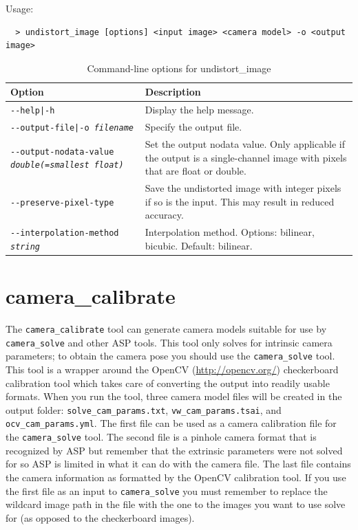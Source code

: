 Usage:
\begin{verbatim}
  > undistort_image [options] <input image> <camera model> -o <output image>
\end{verbatim}

\begin{longtable}{|l|p{7.5cm}|}
\caption{Command-line options for undistort\_image}
\label{tbl:undistortimage}
\endfirsthead
\endhead
\endfoot
\endlastfoot
\hline
Option & Description \\ \hline \hline
\texttt{-\/-help|-h} & Display the help message. \\ \hline
\texttt{-\/-output-file|-o \textit{filename}} & Specify the output file. \\ \hline
\texttt{-\/-output-nodata-value \textit{double(=smallest float)}} & 
Set the output nodata value. Only applicable if the output is a single-channel 
image with pixels that are float or double.  \\ \hline

\texttt{-\/-preserve-pixel-type} & 
Save the undistorted image with integer pixels if so is the input. This may 
result in reduced accuracy.
\\ \hline

\texttt{-\/-interpolation-method \textit{string}} & 
Interpolation method. Options: bilinear, bicubic. Default: bilinear. 
\\ \hline

\end{longtable}

\section{camera\_calibrate}
\label{cameracalibrate}

The \texttt{camera\_calibrate} tool can generate camera models suitable for use by \texttt{camera\_solve}
and other ASP tools.  This tool only solves for intrinsic camera parameters; to obtain the camera pose you
should  use the \texttt{camera\_solve} tool.  This tool is a wrapper around the OpenCV (\url{http://opencv.org/})
checkerboard calibration tool which takes care of converting the output into readily usable formats.  When you
run the tool, three camera model files will be created in the output folder:
\texttt{solve\_cam\_params.txt}, \texttt{vw\_cam\_params.tsai}, and \texttt{ocv\_cam\_params.yml}.
The first file can be used as a camera calibration file for the \texttt{camera\_solve} tool.  The second file
is a pinhole camera format that is recognized by ASP but remember that the extrinsic parameters were not solved
for so ASP is limited in what it can do with the camera file.  The last file contains the camera information as
formatted by the OpenCV calibration tool.  If you use the first file as an input to \texttt{camera\_solve}
you must remember to replace the wildcard image path in the file with the one to the images you want to use
solve for (as opposed to the checkerboard images).


